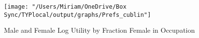 \documentclass[12pt]{article}
\begin{document}
\begin{figure}[H]
\caption{Male and Female Log Utility by Fraction Female in Occupation}
\label{prefs}
\begin{center}
\texttt{[image: "/Users/Miriam/OneDrive/Box Sync/TYPlocal/output/graphs/Prefs\_cublin"]}
\end{center}
\end{figure}
\end{document}
